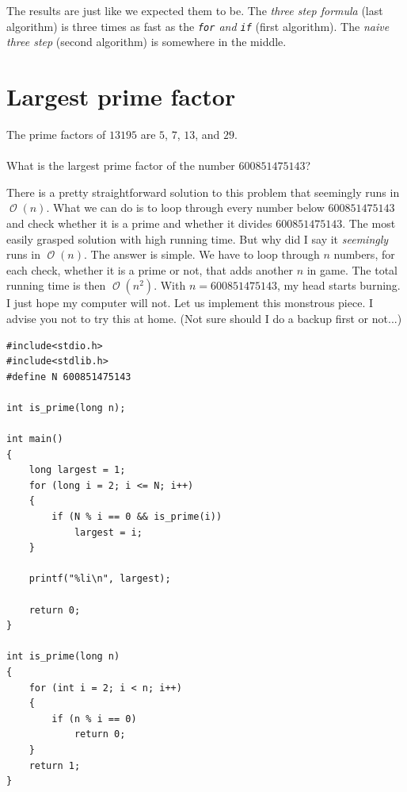 \documentclass{book}
\DeclareMathOperator{\bigo}{\mathcal{O}}
\newenvironment{task}
  {\begin{mdframed}[backgroundcolor=lightgray]}
  {\end{mdframed}}
\begin{document}
The results are just like we expected them to be. The \textit{three step formula} (last algorithm) is three times as fast as the \textit{\texttt{for} and \texttt{if}} (first algorithm). The \textit{naive three step} (second algorithm) is somewhere in the middle.


\section{Largest prime factor}

\begin{task}
The prime factors of $13195$ are $5$, $7$, $13$, and $29$.\\
\\
What is the largest prime factor of the number $600851475143$?
\end{task}

There is a pretty straightforward solution to this problem that seemingly runs in $\bigo(n)$. What we can do is to loop through every number below $600851475143$ and check whether it is a prime and whether it divides $600851475143$. The most easily grasped solution with high running time. But why did I say it \textit{seemingly} runs in $\bigo(n)$. The answer is simple. We have to loop through $n$ numbers, for each check, whether it is a prime or not, that adds another $n$ in game. The total running time is then $\bigo(n^2)$. With $n = 600851475143$, my head starts burning. I just hope my computer will not. Let us implement this monstrous piece. I advise you not to try this at home. (Not sure should I do a backup first or not...)

\begin{verbatim}
#include<stdio.h>
#include<stdlib.h>
#define N 600851475143

int is_prime(long n);

int main()
{
    long largest = 1;
    for (long i = 2; i <= N; i++)
    {
        if (N % i == 0 && is_prime(i))
            largest = i;
    }

    printf("%li\n", largest);

    return 0;
}

int is_prime(long n)
{
    for (int i = 2; i < n; i++)
    {
        if (n % i == 0)
            return 0;
    }
    return 1;
}
\end{verbatim}
\end{document}
